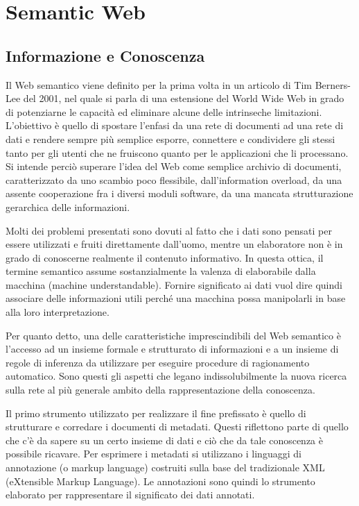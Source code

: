 \documentclass[Lau,binding=0.6cm,noexaminfo,oneside]{sapthesis}
\begin{document}
\chapter{Semantic Web}
\section{Informazione e Conoscenza}

Il Web semantico viene definito per la prima volta in un articolo di Tim Berners-Lee del 2001, nel quale si parla di una estensione del World Wide Web in grado di potenziarne le capacità ed eliminare alcune delle intrinseche limitazioni.
L'obiettivo è quello di spostare l'enfasi da una rete di documenti ad una rete di dati e rendere sempre più semplice esporre, connettere e condividere gli stessi tanto per gli utenti che ne fruiscono quanto per le applicazioni che li processano.
Si intende perciò superare l'idea del Web come semplice archivio di documenti, caratterizzato da uno scambio poco flessibile, dall'information overload, da una assente cooperazione fra i diversi moduli software, da una mancata strutturazione gerarchica delle informazioni.\medskip

Molti dei problemi presentati sono dovuti al fatto che i dati sono pensati per essere utilizzati e fruiti direttamente dall'uomo, mentre un elaboratore non è in grado di conoscerne realmente il contenuto informativo. In questa ottica, il termine semantico assume sostanzialmente la valenza di elaborabile dalla macchina (machine understandable).
Fornire significato ai dati vuol dire quindi associare delle informazioni utili perché una macchina possa manipolarli in base alla loro interpretazione.\medskip

Per quanto detto, una delle caratteristiche imprescindibili del Web semantico è l'accesso ad un insieme formale e strutturato di informazioni e a un insieme di regole di inferenza da utilizzare per eseguire procedure di ragionamento automatico.
Sono questi gli aspetti che legano indissolubilmente la nuova ricerca sulla rete al più generale ambito della rappresentazione della conoscenza.\medskip

Il primo strumento utilizzato per realizzare il fine prefissato è quello di strutturare e corredare i documenti di metadati. Questi riflettono parte di quello che c'è da sapere su un certo insieme di dati e ciò che da tale conoscenza è possibile ricavare.
Per esprimere i metadati si utilizzano i linguaggi di annotazione (o markup language) costruiti sulla base del tradizionale XML (eXtensible Markup Language). Le annotazioni sono quindi lo strumento elaborato per rappresentare il significato dei dati annotati.\medskip
\end{document}
